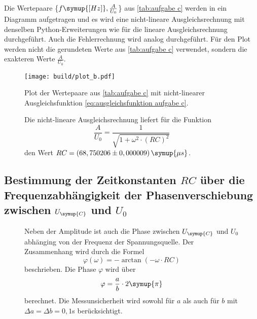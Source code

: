 Die Wertepaare \{$f \symup{[Hz]}, \frac{A}{U_{0}}$\} aus \autoref{tab:aufgabe c} werden in ein Diagramm aufgetragen
und es wird eine nicht-lineare Ausgleichsrechnung mit denselben Python-Erweiterungen wie für die lineare Ausgleichsrechnung
durchgeführt. Auch die Fehlerrechnung wird analog durchgeführt. Für den Plot werden nicht die
gerundeten Werte aus \autoref{tab:aufgabe c} verwendet, sondern die exakteren Werte $\frac{A}{U_{0}}$.

\begin{figure}
  \centering
  \texttt{[image: build/plot\_b.pdf]}
  \caption{Plot der Wertepaare aus \autoref{tab:aufgabe c} mit nicht-linearer Ausgleichsfunktion \autoref{eq:ausgleichsfunktion aufgabe c}.}
  \label{fig:plot_b}
\end{figure}

\begin{figure}[H]
Die nicht-lineare Ausgleichsrechnung liefert für die Funktion 
  \begin{equation}
    \frac{A}{U_{0}} = \frac{1}{\sqrt{1+{\omega}^{2}\cdot (RC)^2}}
    \label{eq:ausgleichsfunktion aufgabe c}
  \end{equation}
den Wert $RC = (68,750206\pm0,000009)\,\symup{\mu s}$.
\end{figure}



\subsection{Bestimmung der Zeitkonstanten $RC$ über die Frequenzabhängigkeit der Phasenverschiebung%
 zwischen $U_{\symup{C}}$ und $U_{0}$}
 \begin{figure}[H]
  Neben der Amplitude ist auch die Phase zwischen $U_{\symup{C}}$ und $U_{0}$ abhänging von der Frequenz der Spannungsquelle.
  Der Zusammenhang wird durch die Formel
  \begin{equation}
    \varphi(\omega) = -\arctan(-\omega \cdot RC)
    \label{eq:Formel für Phasenverschiebung}
  \end{equation}
  beschrieben. 
 Die Phase $\varphi$ wird über
 \begin{equation}
   \varphi = \frac{a}{b}\cdot 2\symup{\pi}
 \end{equation}
 berechnet. Die Messunsicherheit wird sowohl für $a$ als auch für $b$ mit $\Delta a = \Delta b = 0,1$s berücksichtigt.
 \end{figure}
 
